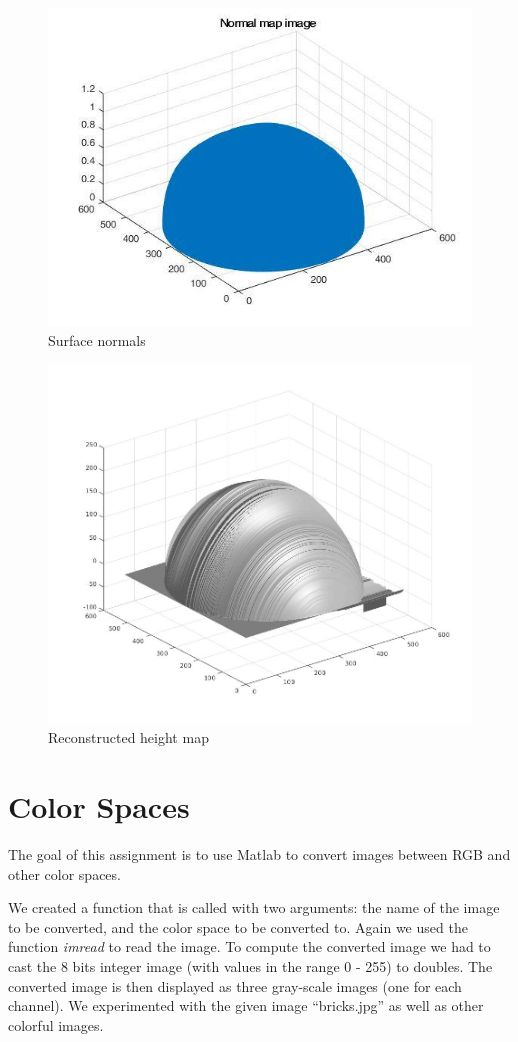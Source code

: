 \documentclass[11pt]{article}
\begin{document}
\begin{figure}[H]
    \centering
    \includegraphics[width=.8\textwidth]{normals.jpg}
    \caption{Surface normals}
    \label{fig:normal_map}
\end{figure}

\begin{figure}[H]
    \centering
    \includegraphics[width=.8\textwidth]{height_map.jpg}
    \caption{Reconstructed height map}
    \label{fig:height_map}
\end{figure}


\section{Color Spaces}
The goal of this assignment is to use Matlab to convert images between RGB and other color spaces.

We created a function that is called with two arguments: the name of the image to be converted, and the color space to be converted to.
Again we used the function \textit{imread} to read the image.
To compute the converted image we had to cast the 8 bits integer image (with values in the range 0 - 255) to doubles.
The converted image is then displayed as three gray-scale images (one for each channel).
We experimented with the given image “bricks.jpg” as well as other colorful images.
\end{document}
